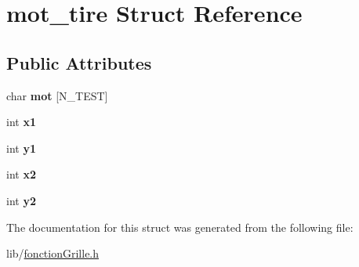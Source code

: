 \hypertarget{structmot__tire}{}\section{mot\+\_\+tire Struct Reference}
\label{structmot__tire}
\subsection*{Public Attributes}
\begin{DoxyCompactItemize}
\item 
\mbox{\label{structmot__tire_aebc1e41960ded6aea099eb692ca6746e}} 
char {\bfseries mot} \mbox{[}N\+\_\+\+T\+E\+ST\mbox{]}
\item 
\mbox{\label{structmot__tire_a51b7e9b7dab614d3ef4bb556cdfbc8b3}} 
int {\bfseries x1}
\item 
\mbox{\label{structmot__tire_a2d39e283b739e7f1820bb6237ca74818}} 
int {\bfseries y1}
\item 
\mbox{\label{structmot__tire_ab843c7ccd0ec1cb432e6049035db376e}} 
int {\bfseries x2}
\item 
\mbox{\label{structmot__tire_a08903bb278fd14092a67e0c7906be977}} 
int {\bfseries y2}
\end{DoxyCompactItemize}


The documentation for this struct was generated from the following file\+:\begin{DoxyCompactItemize}
\item 
lib/\hyperlink{fonctionGrille_8h}{fonction\+Grille.\+h}\end{DoxyCompactItemize}
